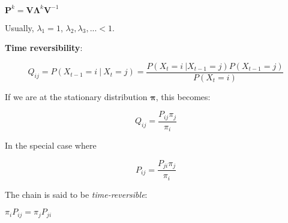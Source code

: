 \documentclass[12pt]{report}
\begin{document}
		\bigskip $\mathbf{P}^k = \mathbf{V} \mathbf{\Lambda}^k \mathbf{V}^{-1}$
		
		\bigskip Usually, $\lambda_1 = 1$, $\lambda_2, \lambda_3, ... < 1$.
		
		\bigskip
		\bigskip\textbf{Time reversibility}:
		
		\bigskip$$Q_{ij} = P(X_{t-1} = i \ | \ X_t = j) = \frac{P(X_t = i \  | X_{t-1} = j) P(X_{t-1} = j)}{P(X_t = i)}$$ 		
		
		\bigskip If we are at the stationary distribution $\boldsymbol{\pi}$, this becomes:
		
		\bigskip$$Q_{ij} = \frac{P_{ij}\pi_j}{\pi_i}$$
		
		\bigskip In the special case where
		
		\bigskip$$P_{ij} = \frac{P_{ji}\pi_j}{\pi_i}$$

		\bigskip The chain is said to be \emph{time-reversible}:
		
		\bigskip$\pi_i P_{ij} = \pi_j P_{ji}$
\end{document}
